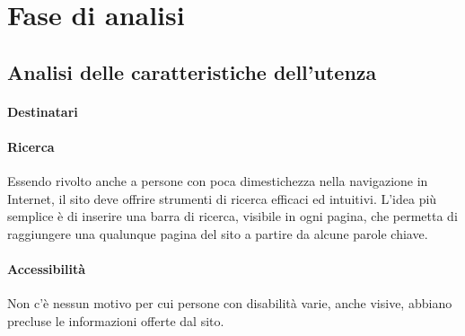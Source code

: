 \section{Fase di analisi}
\subsection{Analisi delle caratteristiche dell'utenza}
\label{sub:analisi_delle_caratteristiche_dell_utenza}
\paragraph{Destinatari}
\label{par:destinatari}

\paragraph{Ricerca}
\label{par:ricerca}
Essendo rivolto anche a persone con poca dimestichezza nella navigazione in Internet, il sito deve offrire strumenti di ricerca efficaci ed intuitivi. L'idea più semplice è di inserire una barra di ricerca, visibile in ogni pagina, che permetta di raggiungere una qualunque pagina del sito a partire da alcune parole chiave.
\paragraph{Accessibilità}
\label{par:accessibilità}
Non c'è nessun motivo per cui persone con disabilità varie, anche visive, abbiano precluse le informazioni offerte dal sito. 
